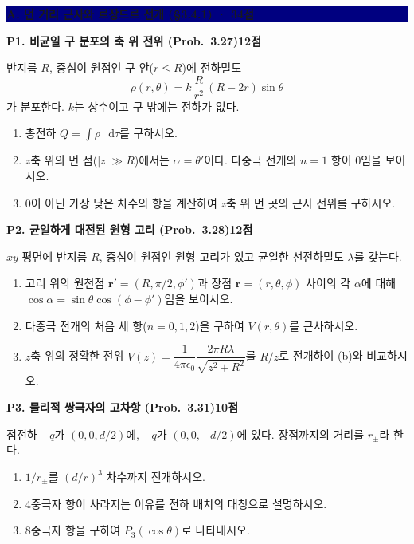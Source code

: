 \documentclass[10pt,a4paper]{article}
\newcommand{\vect}[1]{\symbf{#1}}
\newcommand{\dd}{\mathop{}\!\mathrm{d}}
\newcommand{\problem}[3]{%
  \needspace{0.18\textheight}
  \par\vspace{2.2mm}
  {\large\bfseries\color{navy}#1\hfill{\normalsize\color{blue}#2점}}\par
  \smallskip #3\par
}
\newcommand{\sectionbar}[1]{%
  \needspace{0.25\textheight}
  \par\vspace{2.5mm}
  \colorbox{navy}{\parbox{0.965\linewidth}{\color{white}\bfseries\large #1}}
  \par\vspace{0.5mm}
}
\begin{document}
\sectionbar{A. 먼 거리 근사와 르장드르 전개 (§3.4.1) · 34점}
\problem{P1. 비균일 구 분포의 축 위 전위 (Prob.~3.27)}{12}{%

반지름 $R$, 중심이 원점인 구 안($r\le R$)에 전하밀도
\[
\rho(r,\theta)=k\,\frac{R}{r^2}\,(R-2r)\sin\theta
\]
가 분포한다. $k$는 상수이고 구 밖에는 전하가 없다.
\begin{enumerate}[label=(\alph*)]
  \item 총전하 $Q=\int\rho\,\dd\tau$를 구하시오.
  \item $z$축 위의 먼 점($|z|\gg R$)에서는 $\alpha=\theta'$이다. 다중극 전개의 $n=1$ 항이 0임을 보이시오.
  \item 0이 아닌 가장 낮은 차수의 항을 계산하여 $z$축 위 먼 곳의 근사 전위를 구하시오.
\end{enumerate}
}
\problem{P2. 균일하게 대전된 원형 고리 (Prob.~3.28)}{12}{%

$xy$ 평면에 반지름 $R$, 중심이 원점인 원형 고리가 있고 균일한 선전하밀도 $\lambda$를 갖는다.
\begin{enumerate}[label=(\alph*)]
  \item 고리 위의 원천점 $\vect r'=(R,\pi/2,\phi')$과 장점 $\vect r=(r,\theta,\phi)$ 사이의 각 $\alpha$에 대해 $\cos\alpha=\sin\theta\cos(\phi-\phi')$임을 보이시오.
  \item 다중극 전개의 처음 세 항($n=0,1,2$)을 구하여 $V(r,\theta)$를 근사하시오.
  \item $z$축 위의 정확한 전위 $V(z)=\dfrac{1}{4\pi\epsilon_0}\dfrac{2\pi R\lambda}{\sqrt{z^2+R^2}}$를 $R/z$로 전개하여 (b)와 비교하시오.
\end{enumerate}
}
\problem{P3. 물리적 쌍극자의 고차항 (Prob.~3.31)}{10}{%

점전하 $+q$가 $(0,0,d/2)$에, $-q$가 $(0,0,-d/2)$에 있다. 장점까지의 거리를 $r_\pm$라 한다.
\begin{enumerate}[label=(\alph*)]
  \item $1/r_\pm$를 $(d/r)^3$ 차수까지 전개하시오.
  \item 4중극자 항이 사라지는 이유를 전하 배치의 대칭으로 설명하시오.
  \item 8중극자 항을 구하여 $P_3(\cos\theta)$로 나타내시오.
\end{enumerate}
}
\end{document}

